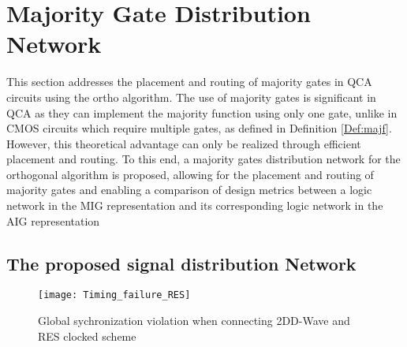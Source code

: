 \section{Majority Gate Distribution Network}\label{sec:majgatedisnet}
This section addresses the placement and routing of majority gates in QCA circuits using the ortho algorithm. The use of majority gates is significant in QCA as they can implement the majority function using only one gate, unlike in CMOS circuits which require multiple gates, as defined in Definition \ref{Def:majf}. However, this theoretical advantage can only be realized through efficient placement and routing. To this end, a majority gates distribution network for the orthogonal algorithm is proposed, allowing for the placement and routing of majority gates and enabling a comparison of design metrics between a logic network in the MIG representation and its corresponding logic network in the AIG representation

\subsection{The proposed signal distribution Network}

\begin{figure}
	\centering
	\texttt{[image: Timing\_failure\_RES]}
	\caption{Global sychronization violation when connecting 2DD-Wave and RES clocked scheme}\label{fig:Timing_failure_RES}
\end{figure}

